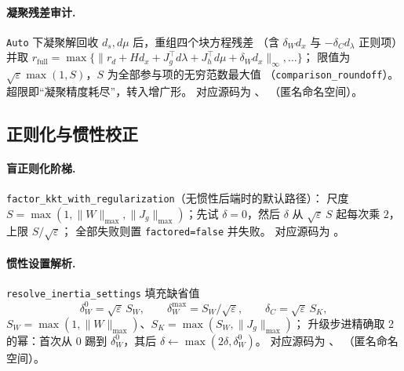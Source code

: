 \paragraph{凝聚残差审计.}
\texttt{Auto} 下凝聚解回收 $d_s, d\mu$ 后，重组四个块方程残差
（含 $\delta_W d_x$ 与 $-\delta_C d_\lambda$ 正则项）并取
$r_{\text{full}} = \max\{\|r_d + H d_x + J_g^{\top} d\lambda +
J_h^{\top} d\mu + \delta_W d_x\|_{\infty}, \ldots\}$；
限值为 $\sqrt{\varepsilon}\max(1, S)$，$S$ 为全部参与项的无穷范数最大值
（\texttt{comparison\_roundoff}）。超限即``凝聚精度耗尽''，转入增广形。
对应源码为 、
（匿名命名空间）。

\subsection{正则化与惯性校正}
\label{subsec:engine-ipm-inertia}

\paragraph{盲正则化阶梯.}
\texttt{factor\_kkt\_with\_regularization}（无惯性后端时的默认路径）：
尺度 $S = \max(1, \|W\|_{\max}, \|J_g\|_{\max})$；先试 $\delta = 0$，然后
$\delta$ 从 $\sqrt{\varepsilon}\, S$ 起每次乘 $2$，上限 $S/\sqrt{\varepsilon}$；
全部失败则置 \texttt{factored=false} 并失败。
对应源码为 。

\paragraph{惯性设置解析.}
\texttt{resolve\_inertia\_settings} 填充缺省值
\begin{equation}
  \delta_W^{0} = \sqrt{\varepsilon}\, S_W,\qquad
  \delta_W^{\max} = S_W / \sqrt{\varepsilon},\qquad
  \delta_C = \sqrt{\varepsilon}\, S_K,
  \label{eq:ipm:inertia-settings}
\end{equation}
$S_W = \max(1, \|W\|_{\max})$、$S_K = \max(S_W, \|J_g\|_{\max})$；
升级步进精确取 2 的幂：首次从 $0$ 踢到 $\delta_W^{0}$，其后
$\delta \leftarrow \max(2\delta, \delta_W^{0})$。
对应源码为 、
（匿名命名空间）。

